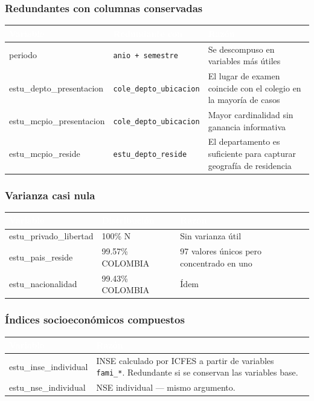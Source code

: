 \documentclass[12pt, a4paper]{article}
\newcommand{\thead}[1]{\cellcolor{tabheader}\textcolor{white}{\textbf{#1}}}
\begin{document}
\subsubsection{Redundantes con columnas conservadas}

\vspace{4pt}
\begin{tabularx}{\textwidth}{>{\ttfamily}l l X}
  \toprule
  \thead{Variable} & \thead{Redundante con} & \thead{Razón} \\
  \midrule
  \rowcolor{rowalt}
  periodo                  & \texttt{anio + semestre} & Se descompuso en variables más útiles \\
  estu\_depto\_presentacion & \texttt{cole\_depto\_ubicacion} & El lugar de examen coincide con el colegio en la mayoría de casos \\
  \rowcolor{rowalt}
  estu\_mcpio\_presentacion & \texttt{cole\_depto\_ubicacion} & Mayor cardinalidad sin ganancia informativa \\
  estu\_mcpio\_reside       & \texttt{estu\_depto\_reside} & El departamento es suficiente para capturar geografía de residencia \\
  \bottomrule
\end{tabularx}

\subsubsection{Varianza casi nula}

\vspace{4pt}
\begin{tabularx}{\textwidth}{>{\ttfamily}l l X}
  \toprule
  \thead{Variable} & \thead{Distribución} & \thead{Razón} \\
  \midrule
  \rowcolor{rowalt}
  estu\_privado\_libertad & 100\% N & Sin varianza útil \\
  estu\_pais\_reside      & 99.57\% COLOMBIA & 97 valores únicos pero concentrado en uno \\
  \rowcolor{rowalt}
  estu\_nacionalidad      & 99.43\% COLOMBIA & Ídem \\
  \bottomrule
\end{tabularx}

\subsubsection{Índices socioeconómicos compuestos}

\vspace{4pt}
\begin{tabularx}{\textwidth}{>{\ttfamily}l X}
  \toprule
  \thead{Variable} & \thead{Razón} \\
  \midrule
  \rowcolor{rowalt}
  estu\_inse\_individual & INSE calculado por ICFES a partir de variables \texttt{fami\_*}. Redundante si se conservan las variables base. \\
  estu\_nse\_individual  & NSE individual — mismo argumento. \\
  \bottomrule
\end{tabularx}
\vspace{6pt}
\end{document}
